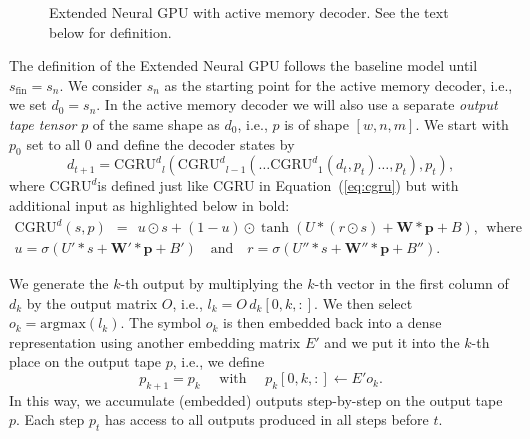 \documentclass{article}
\newcommand\sigmoid{\sigma}
\newcommand\argmax{\mathrm{argmax}}
\newcommand\dcgru{\ensuremath{\mathrm{CGRU}^d}}
\newcommand\sfin{s_\mathrm{fin}}
\begin{document}
\begin{figure}
\begin{center}
\end{center}

\caption{Extended Neural GPU with active memory decoder. See the text
  below for definition.}
\label{fig:cgrnext}
\end{figure}

The definition of the Extended Neural GPU follows the baseline
model until $\sfin = s_n$. We consider $s_n$ as the starting point
for the active memory decoder, i.e., we set $d_0 = s_n$. In the
active memory decoder we will also use a separate \emph{output tape tensor}
$p$ of the same shape as $d_0$, i.e., $p$ is of shape $[w,n,m]$.
We start with $p_0$ set to all $0$ and define the decoder states by
\[ d_{t+1} = \dcgru_l(\dcgru_{l-1} (\dots \dcgru_1(d_t, p_t) \dots, p_t), p_t), \]
where \dcgru is defined just like CGRU in Equation~(\ref{eq:cgru})
but with additional input as highlighted below in bold:
\begin{equation} \label{eq:dcgru}
\begin{split}
\dcgru(s, p) \ \ =\ \ u \odot s + (1 - u) \odot \tanh(U * (r \odot s) + \boldsymbol{W * p} + B),
     \ \ \textrm{where} \\
u = \sigmoid(U' * s + \boldsymbol{W' * p} + B')\quad \mathrm{and}\quad
r = \sigmoid(U''*s + \boldsymbol{W''*p} + B'').
\end{split}
\end{equation}

We generate the $k$-th output by multiplying the $k$-th vector in
the first column of $d_k$ by the output matrix $O$, i.e.,
$l_k = O \, d_k[0,k,:]$. We then select $o_k = \argmax(l_k)$.
The symbol $o_k$ is then embedded back into a dense representation
using another embedding matrix $E'$ and we put it into the $k$-th
place on the output tape $p$, i.e., we define
\[ p_{k+1} = p_k \quad \textrm{ with } \quad p_k[0,k,:] \leftarrow E' o_k. \]
In this way, we accumulate (embedded) outputs step-by-step
on the output tape $p$. Each step $p_t$ has access to all
outputs produced in all steps before $t$.
\end{document}
